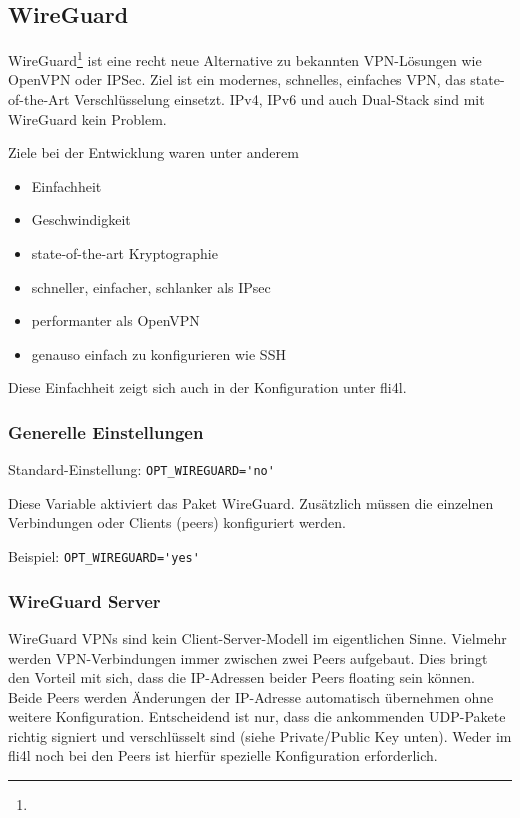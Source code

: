 
\subsection{WireGuard}

WireGuard\footnote{} ist eine recht
neue Alternative zu bekannten VPN-Lösungen wie OpenVPN oder IPSec. Ziel
ist ein modernes, schnelles, einfaches VPN, das state-of-the-Art
Verschlüsselung einsetzt. IPv4, IPv6 und auch Dual-Stack sind mit
WireGuard kein Problem.

Ziele bei der Entwicklung waren unter anderem

\begin{itemize}
    \item Einfachheit
    \item Geschwindigkeit
    \item state-of-the-art Kryptographie
    \item schneller, einfacher, schlanker als IPsec
    \item performanter als OpenVPN
    \item genauso einfach zu konfigurieren wie SSH
\end{itemize}

Diese Einfachheit zeigt sich auch in der Konfiguration unter fli4l.


\subsubsection{Generelle Einstellungen}

\begin{description}


Standard-Einstellung: \verb+OPT_WIREGUARD='no'+

Diese Variable aktiviert das Paket WireGuard. Zusätzlich müssen die einzelnen
Verbindungen oder Clients (peers) konfiguriert werden.

Beispiel: \verb+OPT_WIREGUARD='yes'+

\end{description}


\subsubsection{WireGuard Server}

WireGuard VPNs sind kein Client-Server-Modell im eigentlichen Sinne. Vielmehr werden
VPN-Verbindungen immer zwischen zwei Peers aufgebaut. Dies bringt den Vorteil mit
sich, dass die IP-Adressen beider Peers floating sein können. Beide Peers werden
Änderungen der IP-Adresse automatisch übernehmen ohne weitere Konfiguration.
Entscheidend ist nur, dass die ankommenden UDP-Pakete richtig signiert und
verschlüsselt sind (siehe Private/Public Key unten). Weder im fli4l noch bei den
Peers ist hierfür spezielle Konfiguration erforderlich.

